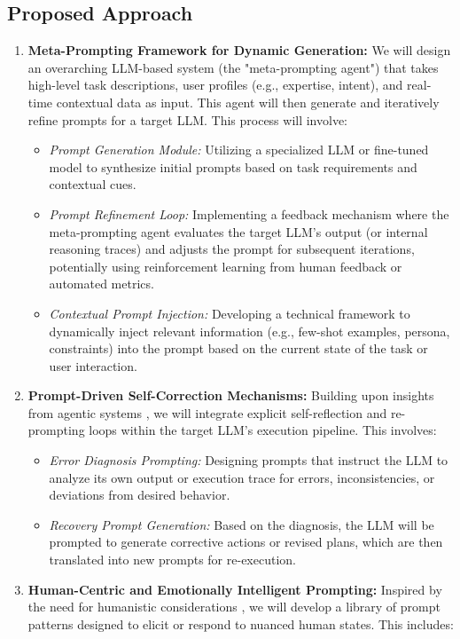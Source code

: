 \documentclass{article}
\begin{document}
\subsection{Proposed Approach}
\begin{enumerate}
    \item \textbf{Meta-Prompting Framework for Dynamic Generation:} We will design an overarching LLM-based system (the "meta-prompting agent") that takes high-level task descriptions, user profiles (e.g., expertise, intent), and real-time contextual data as input. This agent will then generate and iteratively refine prompts for a target LLM. This process will involve:
    \begin{itemize}
        \item \textit{Prompt Generation Module:} Utilizing a specialized LLM or fine-tuned model to synthesize initial prompts based on task requirements and contextual cues.
        \item \textit{Prompt Refinement Loop:} Implementing a feedback mechanism where the meta-prompting agent evaluates the target LLM's output (or internal reasoning traces) and adjusts the prompt for subsequent iterations, potentially using reinforcement learning from human feedback or automated metrics.
        \item \textit{Contextual Prompt Injection:} Developing a technical framework to dynamically inject relevant information (e.g., few-shot examples, persona, constraints) into the prompt based on the current state of the task or user interaction.
    \end{itemize}
    \item \textbf{Prompt-Driven Self-Correction Mechanisms:} Building upon insights from agentic systems \cite{PaperOne}, we will integrate explicit self-reflection and re-prompting loops within the target LLM's execution pipeline. This involves:
    \begin{itemize}
        \item \textit{Error Diagnosis Prompting:} Designing prompts that instruct the LLM to analyze its own output or execution trace for errors, inconsistencies, or deviations from desired behavior.
        \item \textit{Recovery Prompt Generation:} Based on the diagnosis, the LLM will be prompted to generate corrective actions or revised plans, which are then translated into new prompts for re-execution.
    \end{itemize}
    \item \textbf{Human-Centric and Emotionally Intelligent Prompting:} Inspired by the need for humanistic considerations \cite{PaperTwo}, we will develop a library of prompt patterns designed to elicit or respond to nuanced human states. This includes:

\end{enumerate}
\end{document}
